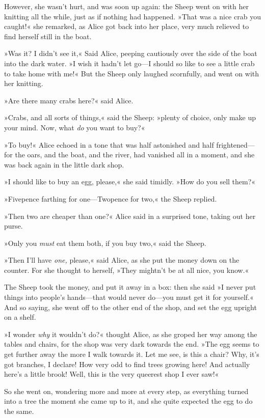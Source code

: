 However, she wasn't hurt, and was soon up again: the Sheep went on with her knitting all the while, just as if nothing had happened. »That was a nice crab you caught!« she remarked, as Alice got back into her place, very much relieved to find herself still in the boat.

»Was it? I didn't see it,« Said Alice, peeping cautiously over the side of the boat into the dark water. »I wish it hadn't let go—I should so like to see a little crab to take home with me!« But the Sheep only laughed scornfully, and went on with her knitting.

»Are there many crabs here?« said Alice.

»Crabs, and all sorts of things,« said the Sheep: »plenty of choice, only make up your mind. Now, what \textit{do} you want to buy?«

\label{white4}
»To buy!« Alice echoed in a tone that was half astonished and half frightened—for the oars, and the boat, and the river, had vanished all in a moment, and she was back again in the little dark shop.

»I should like to buy an egg, please,« she said timidly. »How do you sell them?«

»Fivepence farthing for one—Twopence for two,« the Sheep replied.

»Then two are cheaper than one?« Alice said in a surprised tone, taking out her purse.

»Only you \textit{must} eat them both, if you buy two,« said the Sheep.

»Then I'll have \textit{one,} please,« said Alice, as she put the money down on the counter. For she thought to herself, »They mightn't be at all nice, you know.«

The Sheep took the money, and put it away in a box: then she said »I never put things into people's hands—that would never do—you must get it for yourself.« And so saying, she went off to the other end of the shop, and set the egg upright on a shelf.
\label{black4}

»I wonder \textit{why} it wouldn't do?« thought Alice, as she groped her way among the tables and chairs, for the shop was very dark towards the end. »The egg seems to get further away the more I walk towards it. Let me see, is this a chair? Why, it's got branches, I declare! How very odd to find trees growing here! And actually here's a little brook! Well, this is the very queerest shop I ever saw!«

So she went on, wondering more and more at every step, as everything turned into a tree the moment she came up to it, and she quite expected the egg to do the same.